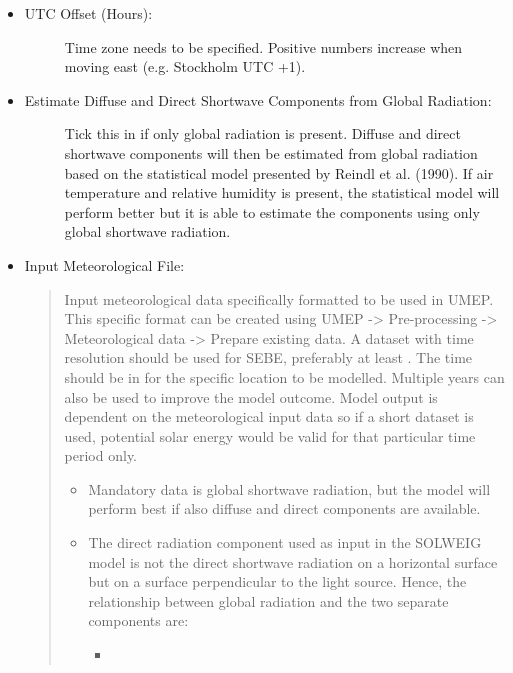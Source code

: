 \documentclass[letterpaper,10pt,english]{sphinxmanual}
\begin{document}
\begin{itemize}
\begin{description}
\end{description}

\item {} \begin{description}
\item[{UTC Offset (Hours):}] \leavevmode
Time zone needs to be specified. Positive numbers increase when moving east (e.g. Stockholm UTC +1).

\end{description}

\item {} \begin{description}
\item[{Estimate Diffuse and Direct Shortwave Components from Global Radiation:}] \leavevmode
Tick this in if only global radiation is present. Diffuse and direct shortwave components will then be estimated from global radiation based on the statistical model presented by Reindl et al. (1990). If air temperature and relative humidity is present, the statistical model will perform better but it is able to estimate the components using only global shortwave radiation.

\end{description}

\item {} 
Input Meteorological File:
\begin{quote}

Input meteorological data specifically formatted to be used in UMEP. This specific format can be created using UMEP  -\textgreater{} Pre-processing  -\textgreater{} Meteorological data  -\textgreater{} Prepare existing data. A dataset with  time resolution should be used for SEBE, preferably at least . The time should be in {\hyperref[\detokenize{Abbreviations:abbreviations}]{}} for the specific location to be modelled. Multiple years can also be used to improve the model outcome. Model output is dependent on the meteorological input data so if a short dataset is used, potential solar energy would be valid for that particular time period only.
\begin{itemize}
\item {} 
Mandatory data is global shortwave radiation, but the model will perform best if also diffuse and direct components are available.

\item {} 
The direct radiation component used as input in the SOLWEIG model is not the direct shortwave radiation on a horizontal surface but on a surface perpendicular to the light source. Hence, the relationship between global radiation and the two separate components are:
\begin{itemize}
\item {} 


\end{itemize}
\end{itemize}
\end{quote}
\end{itemize}
\end{document}
